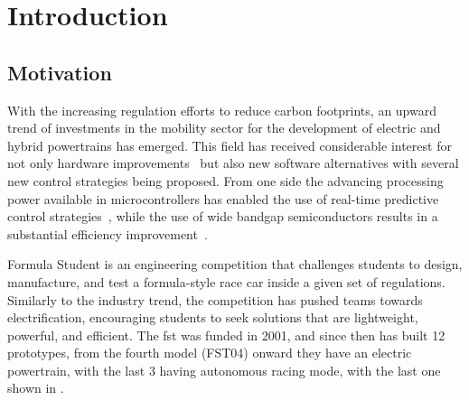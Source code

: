 
\chapter{Introduction}\label{chapter:introduction}
\minitoc%

\section{Motivation}\label{section:motivation}
With the increasing regulation efforts to reduce carbon footprints, an upward trend of investments in the mobility sector for the development of electric and hybrid powertrains has emerged. This field has received considerable interest for not only hardware improvements~\cite{Wang:power_converter_review:2020} but also new software alternatives with several new control strategies being proposed. From one side the advancing processing power available in microcontrollers has enabled the use of real-time predictive control strategies~\cite{Karamanakos:MPC_in_power_electronics:2020}, while the use of wide bandgap semiconductors results in a substantial efficiency improvement~\cite{Palmour:wide_bandgap_efficiency:2006}.

Formula Student is an engineering competition that challenges students to design, manufacture, and test a formula-style race car inside a given set of regulations. Similarly to the industry trend, the competition has pushed teams towards electrification, encouraging students to seek solutions that are lightweight, powerful, and efficient. The \gls{fst} was funded in 2001, and since then has built 12 prototypes, from the fourth model (FST04) onward they have an electric powertrain, with the last 3 having autonomous racing mode, with the last one shown in .

